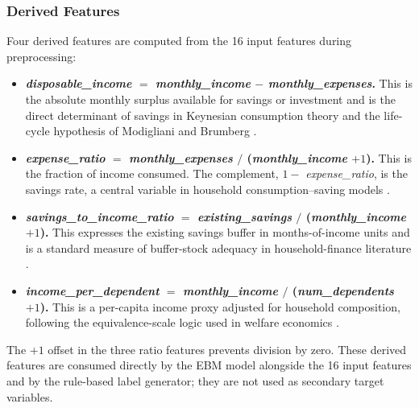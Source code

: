 \documentclass{icsthesis}
\begin{document}
\begin{mainmatter}
				\subsubsection{Derived Features}
					Four derived features are computed from the 16 input features during preprocessing:

					\begin{itemize}
					    \item \textbf{\emph{disposable\_income} $=$ \emph{monthly\_income} $-$ \emph{monthly\_expenses}.} This is the absolute monthly surplus available for savings or investment and is the direct determinant of savings in Keynesian consumption theory and the life-cycle hypothesis of Modigliani and Brumberg \cite{ref65}.
					    \item \textbf{\emph{expense\_ratio} $=$ \emph{monthly\_expenses} $/$ (\emph{monthly\_income} $+ 1$).} This is the fraction of income consumed. The complement, $1 -$ \emph{expense\_ratio}, is the savings rate, a central variable in household consumption--saving models \cite{ref55}.
					    \item \textbf{\emph{savings\_to\_income\_ratio} $=$ \emph{existing\_savings} $/$ (\emph{monthly\_income} $+ 1$).} This expresses the existing savings buffer in months-of-income units and is a standard measure of buffer-stock adequacy in household-finance literature \cite{ref55}.
					    \item \textbf{\emph{income\_per\_dependent} $=$ \emph{monthly\_income} $/$ (\emph{num\_dependents} $+ 1$).} This is a per-capita income proxy adjusted for household composition, following the equivalence-scale logic used in welfare economics \cite{ref55}.
					\end{itemize}

					The $+1$ offset in the three ratio features prevents division by zero. These derived features are consumed directly by the EBM model alongside the 16 input features and by the rule-based label generator; they are not used as secondary target variables.


\end{mainmatter}
\end{document}

